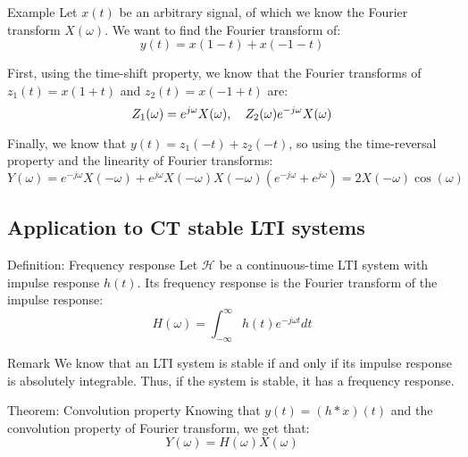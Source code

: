 \documentclass[a4paper]{article}
\begin{document}
\begin{parag}{Example}
    Let $x\left(t\right)$ be an arbitrary signal, of which we know the Fourier transform $X\left(\omega\right)$. We want to find the Fourier transform of: 
    \[y\left(t\right) = x\left(1 - t\right) + x\left(-1 - t\right)\]
    
    First, using the time-shift property, we know that the Fourier transforms of $z_1\left(t\right) = x\left(1 + t\right)$ and $z_2\left(t\right) = x\left(-1 + t\right)$ are: 
    \[Z_1\left(\omega\right) = e^{j \omega} X\left(\omega\right), \mathspace Z_2\left(\omega\right) e^{-j \omega} X\left(\omega\right)\]
    
    Finally, we know that $y\left(t\right) = z_1\left(-t\right) + z_2\left(-t\right)$, so using the time-reversal property and the linearity of Fourier transforms: 
    \[Y\left(\omega\right) = e^{-j \omega} X\left(-\omega\right) + e^{j\omega} X\left(-\omega\right) X\left(-\omega\right) \left(e^{-j \omega} + e^{j \omega}\right) = 2 X\left(-\omega\right) \cos\left(\omega\right)\]
\end{parag}

\subsection{Application to CT stable LTI systems}
\begin{parag}{Definition: Frequency response}
    Let $\mathcal{H}$ be a continuous-time LTI system with impulse response $h\left(t\right)$. Its frequency response is the Fourier transform of the impulse response: 
    \[H\left(\omega\right) = \int_{-\infty}^{\infty} h\left(t\right) e^{-j \omega t} dt\]
    
    \begin{subparag}{Remark}
        We know that an LTI system is stable if and only if its impulse response is absolutely integrable. Thus, if the system is stable, it has a frequency response. 
    \end{subparag}
\end{parag}

\begin{parag}{Theorem: Convolution property}
    Knowing that $y\left(t\right) = \left(h * x\right)\left(t\right)$ and the convolution property of Fourier transform, we get that: 
    \[Y\left(\omega\right) = H\left(\omega\right)X\left(\omega\right)\]
\end{parag}
\end{document}
